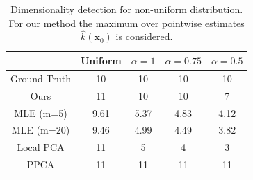    \begin{table}
       \begin{center}
       \small
       \begin{tabular}{ccccc}
       \toprule
       & Uniform & $\alpha=1$ & $\alpha=0.75$ & $\alpha=0.5$  \\
       \midrule
       \multirow{1}{*}{Ground Truth} 
       &10 & 10 & 10  & 10    \\
       \midrule
       \multirow{1}{*}{Ours}
       &11 & 10 & 10  & 7 \\
       \midrule
       
       \multirow{1}{*}{MLE (m=5)}
       &9.61 & 5.37 & 4.83  & 4.12   \\
       \midrule
   
       \multirow{1}{*}{MLE (m=20)}
       &9.46 & 4.99 & 4.49  & 3.82 \\
       \midrule
   
       \multirow{1}{*}{Local PCA}
       & 11 & 5 & 4  & 3  \\
       \midrule
   
       \multirow{1}{*}{PPCA}
       & 11 & 11 & 11  & 11  \\
       
       \bottomrule
       \end{tabular}
       \end{center}
       \caption{Dimensionality detection for non-uniform distribution. For our method the maximum over pointwise estimates $\hat{k}(\textbf{x}_0)$ is considered.}
       \label{ch3:tbl:non_uniform}
   \end{table}
   
